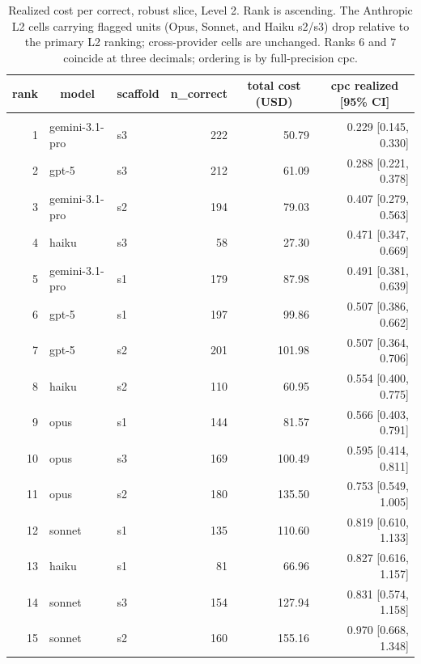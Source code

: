 \documentclass[10pt]{article} %
\begin{document}
        \begin{table}[t]
            \caption{Realized cost per correct, robust slice, Level 2. Rank is ascending. The Anthropic L2 cells carrying flagged units (Opus, Sonnet, and Haiku s2/s3) drop relative to the primary L2 ranking; cross-provider cells are unchanged. Ranks 6 and 7 coincide at three decimals; ordering is by full-precision cpc.}
        \label{tab:cpc_robust_L2_ranked}
        \begin{center}
        \small
        \begin{tabular}{rllrrr}
            \multicolumn{1}{c}{\bf rank} & \multicolumn{1}{c}{\bf model} & \multicolumn{1}{c}{\bf scaffold} & \multicolumn{1}{c}{\bf n\_correct} & \multicolumn{1}{c}{\bf total cost (USD)} & \multicolumn{1}{c}{\bf cpc realized [95\% CI]} \\
            \hline \\
            1 & gemini-3.1-pro & s3 & 222 & 50.79 & 0.229 [0.145, 0.330] \\
            2 & gpt-5 & s3 & 212 & 61.09 & 0.288 [0.221, 0.378] \\
            3 & gemini-3.1-pro & s2 & 194 & 79.03 & 0.407 [0.279, 0.563] \\
            4 & haiku & s3 & 58 & 27.30 & 0.471 [0.347, 0.669] \\
            5 & gemini-3.1-pro & s1 & 179 & 87.98 & 0.491 [0.381, 0.639] \\
            6 & gpt-5 & s1 & 197 & 99.86 & 0.507 [0.386, 0.662] \\
            7 & gpt-5 & s2 & 201 & 101.98 & 0.507 [0.364, 0.706] \\
            8 & haiku & s2 & 110 & 60.95 & 0.554 [0.400, 0.775] \\
            9 & opus & s1 & 144 & 81.57 & 0.566 [0.403, 0.791] \\
            10 & opus & s3 & 169 & 100.49 & 0.595 [0.414, 0.811] \\
            11 & opus & s2 & 180 & 135.50 & 0.753 [0.549, 1.005] \\
            12 & sonnet & s1 & 135 & 110.60 & 0.819 [0.610, 1.133] \\
            13 & haiku & s1 & 81 & 66.96 & 0.827 [0.616, 1.157] \\
            14 & sonnet & s3 & 154 & 127.94 & 0.831 [0.574, 1.158] \\
            15 & sonnet & s2 & 160 & 155.16 & 0.970 [0.668, 1.348] \\
        \end{tabular}
        \end{center}
        \end{table}
\end{document}
